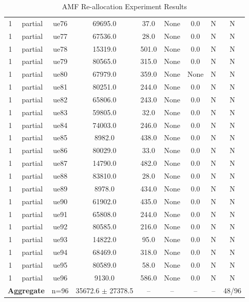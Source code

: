 \begin{table}[ht]
\begin{tabular}{|c|c|c|c|c|c|c|c|c|}
1 & partial & ue76 & 69695.0 & 37.0 & None & 0.0 & N & N \\
1 & partial & ue77 & 67536.0 & 28.0 & None & 0.0 & N & N \\
1 & partial & ue78 & 15319.0 & 501.0 & None & 0.0 & N & N \\
1 & partial & ue79 & 80565.0 & 315.0 & None & 0.0 & N & N \\
1 & partial & ue80 & 67979.0 & 359.0 & None & None & N & N \\
1 & partial & ue81 & 80251.0 & 244.0 & None & 0.0 & N & N \\
1 & partial & ue82 & 65806.0 & 243.0 & None & 0.0 & N & N \\
1 & partial & ue83 & 59805.0 & 32.0 & None & 0.0 & N & N \\
1 & partial & ue84 & 74003.0 & 246.0 & None & 0.0 & N & N \\
1 & partial & ue85 & 8982.0 & 438.0 & None & 0.0 & N & N \\
1 & partial & ue86 & 80029.0 & 33.0 & None & 0.0 & N & N \\
1 & partial & ue87 & 14790.0 & 482.0 & None & 0.0 & N & N \\
1 & partial & ue88 & 83810.0 & 28.0 & None & 0.0 & N & N \\
1 & partial & ue89 & 8978.0 & 434.0 & None & 0.0 & N & N \\
1 & partial & ue90 & 61902.0 & 435.0 & None & 0.0 & N & N \\
1 & partial & ue91 & 65808.0 & 244.0 & None & 0.0 & N & N \\
1 & partial & ue92 & 80585.0 & 216.0 & None & 0.0 & N & N \\
1 & partial & ue93 & 14822.0 & 95.0 & None & 0.0 & N & N \\
1 & partial & ue94 & 68469.0 & 318.0 & None & 0.0 & N & N \\
1 & partial & ue95 & 80589.0 & 58.0 & None & 0.0 & N & N \\
1 & partial & ue96 & 9130.0 & 586.0 & None & 0.0 & N & N \\
\multicolumn{2}{|c|}{\textbf{Aggregate}} & n=96 & 35672.6 $\pm$ 27378.5 & -- & -- & -- & -- & 48/96 \\
\hline
\end{tabular}
\caption{AMF Re-allocation Experiment Results}
\label{tab:amf_realloc}
\end{table}
